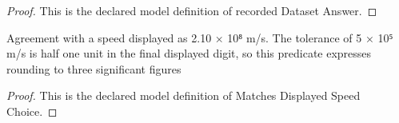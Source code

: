 \begin{proof}
  This is the declared model definition of recorded Dataset Answer.
\end{proof}
\begin{definition}
  \label{def:physics:phyx-mini-0608:phyxminiproblems-problemphyxmini0608-matchesdisplayedspeedchoice}
  Agreement with a speed displayed as 2.10 × 10⁸ m/s. The tolerance of 5 × 10⁵ m/s is half one unit in the final displayed digit, so this predicate expresses rounding to three significant figures
\end{definition}
\begin{proof}
  This is the declared model definition of Matches Displayed Speed Choice.
\end{proof}
